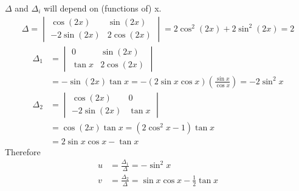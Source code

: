 \begin{solution}
$\Delta$ and $\Delta_i$ will depend on (functions of) x.
\begin{align*}
\Delta = 
\begin{vmatrix}
\cos(2x) & \sin(2x) \\ 
-2\sin(2x) & 2\cos(2x)
\end{vmatrix}
= 2\cos^2(2x) + 2\sin^2(2x) = 2
\end{align*}
\begin{align*}
\Delta_1 &= 
\begin{vmatrix}
0 & \sin(2x) \\ 
\tan x & 2\cos(2x)
\end{vmatrix} \\
& = -\sin(2x)\tan x = -(2\sin x\cos x)(\frac{\sin x}{\cos x}) = -2\sin^2 x \\
\Delta_2 &= 
\begin{vmatrix}
\cos(2x) & 0 \\ 
-2\sin(2x) & \tan x
\end{vmatrix} \\
&= \cos(2x)\tan x = (2\cos^2 x - 1)\tan x \\
&= 2\sin x \cos x - \tan x 
\end{align*}
Therefore
\begin{align*}
u &= \frac{\Delta_1}{\Delta} = -\sin^2 x \\
v &= \frac{\Delta_2}{\Delta} = \sin x \cos x - \frac{1}{2}\tan x \\
\end{align*}
\end{solution}

